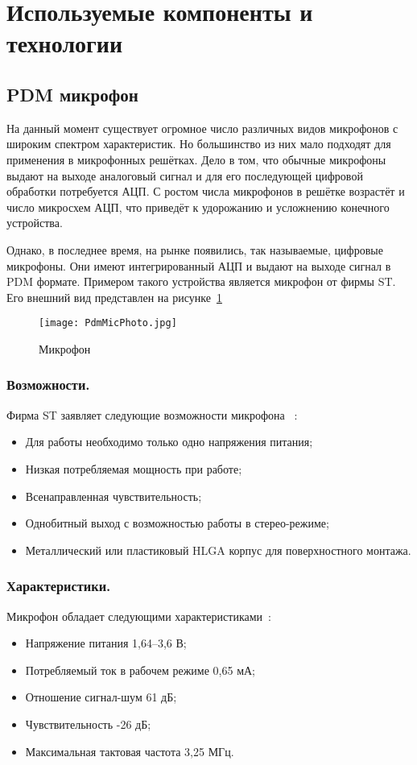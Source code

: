 \section{Используемые компоненты и технологии}
\label{section:Technologies}

\subsection{PDM микрофон \micname{}}
На данный момент существует огромное число различных видов микрофонов с широким спектром характеристик. Но большинство из них мало подходят для применения в микрофонных решётках. Дело в том, что обычные микрофоны выдают на выходе аналоговый сигнал и для его последующей цифровой обработки потребуется АЦП. С ростом числа микрофонов в решётке возрастёт и число микросхем АЦП, что приведёт к удорожанию и усложнению конечного устройства.

Однако, в последнее время, на рынке появились, так называемые, цифровые микрофоны. Они имеют интегрированный АЦП и выдают на выходе сигнал в PDM формате. Примером такого устройства является микрофон \micname{} от фирмы ST. Его внешний вид представлен на рисунке~\ref{fig:PdmMicPhoto}

\begin{figure}[ht]
	\centering
	\texttt{[image: PdmMicPhoto.jpg]}  
	\caption{Микрофон \micname{}}
	\label{fig:PdmMicPhoto}
\end{figure}

\subsubsection{Возможности. }
Фирма ST заявляет следующие возможности микрофона \micname~\cite{ST_MP45DT02}:
\begin{itemize}
	\item Для работы необходимо только одно напряжения питания;
	\item Низкая потребляемая мощность при работе;
	\item Всенаправленная чувствительность;
	\item Однобитный выход с возможностью работы в стерео-режиме;
	\item Металлический или пластиковый HLGA корпус для поверхностного монтажа.
\end{itemize}

\subsubsection{Характеристики. }
Микрофон \micname{} обладает следующими характеристиками~\cite{ST_MP45DT02}:
\begin{itemize}
	\item Напряжение питания 1,64--3,6 В;
	\item Потребляемый ток в рабочем режиме 0,65 мА;
	\item Отношение сигнал-шум 61 дБ;
	\item Чувствительность -26 дБ;
	\item Максимальная тактовая частота 3,25 МГц.
\end{itemize}

